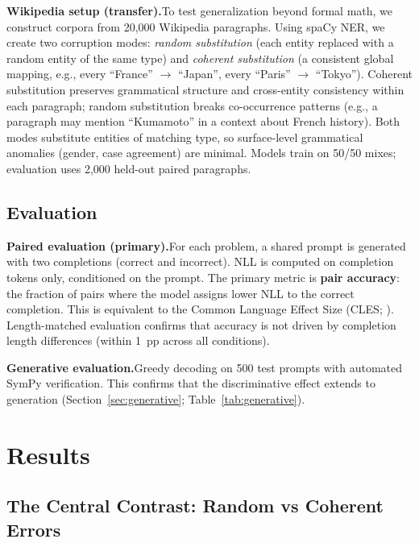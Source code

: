 \documentclass{article}
\begin{document}
\textbf{Wikipedia setup (transfer).}\quad To test generalization beyond formal math, we construct corpora from 20,000 Wikipedia paragraphs. Using spaCy NER, we create two corruption modes: \emph{random substitution} (each entity replaced with a random entity of the same type) and \emph{coherent substitution} (a consistent global mapping, e.g., every ``France'' $\to$ ``Japan'', every ``Paris'' $\to$ ``Tokyo''). Coherent substitution preserves grammatical structure and cross-entity consistency within each paragraph; random substitution breaks co-occurrence patterns (e.g., a paragraph may mention ``Kumamoto'' in a context about French history). Both modes substitute entities of matching type, so surface-level grammatical anomalies (gender, case agreement) are minimal. Models train on 50/50 mixes; evaluation uses 2,000 held-out paired paragraphs.

\subsection{Evaluation}
\label{sec:evaluation}

\textbf{Paired evaluation (primary).}\quad For each problem, a shared prompt is generated with two completions (correct and incorrect). NLL is computed on completion tokens only, conditioned on the prompt. The primary metric is \textbf{pair accuracy}: the fraction of pairs where the model assigns lower NLL to the correct completion. This is equivalent to the Common Language Effect Size (CLES; \citealp{mcgraw1992common}). Length-matched evaluation confirms that accuracy is not driven by completion length differences (within 1~pp across all conditions).

\textbf{Generative evaluation.}\quad Greedy decoding on 500 test prompts with automated SymPy verification. This confirms that the discriminative effect extends to generation (Section~\ref{sec:generative}; Table~\ref{tab:generative}).

\section{Results}
\label{sec:results}

\subsection{The Central Contrast: Random vs Coherent Errors}
\label{sec:central}
\end{document}
